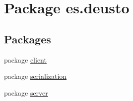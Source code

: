 \hypertarget{namespacees_1_1deusto}{}\section{Package es.\+deusto}
\label{namespacees_1_1deusto}
\subsection*{Packages}
\begin{DoxyCompactItemize}
\item 
package \mbox{\hyperlink{namespacees_1_1deusto_1_1client}{client}}
\item 
package \mbox{\hyperlink{namespacees_1_1deusto_1_1serialization}{serialization}}
\item 
package \mbox{\hyperlink{namespacees_1_1deusto_1_1server}{server}}
\end{DoxyCompactItemize}
